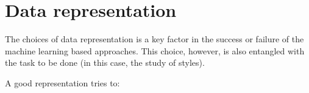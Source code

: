 \section{Data representation}\label{sec:data_representation}

  The choices of data representation is a key factor in the success or failure of the machine learning based approaches. This choice, however, is also entangled with the task to be done (in this case, the study of styles).

  A good representation tries to:

